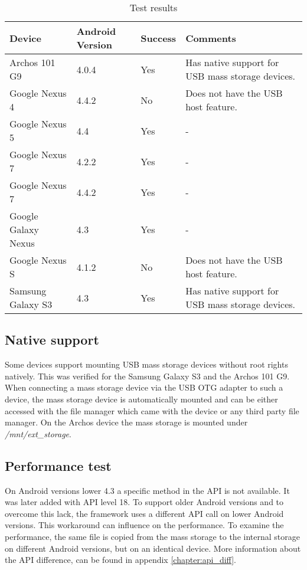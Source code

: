 \begin{table}[ht]
\caption{Test results}
\centering
\begin{tabular}{|l|l|l|p{5.5cm}|}
\hline\hline
\textbf{Device} & \textbf{Android Version} & \textbf{Success} & \textbf{Comments} \\ \hline
Archos 101 G9 & 4.0.4 & Yes & Has native support for USB mass storage devices. \\ \hline
Google Nexus 4 & 4.4.2 & No & Does not have the USB host feature\cite{nexus_4_usb_host}. \\ \hline
Google Nexus 5 & 4.4 & Yes & - \\ \hline
Google Nexus 7 & 4.2.2 & Yes & - \\ \hline
Google Nexus 7 & 4.4.2 & Yes & - \\ \hline
Google Galaxy Nexus & 4.3 & Yes & - \\ \hline
Google Nexus S & 4.1.2 & No & Does not have the USB host feature. \\ \hline
Samsung Galaxy S3 & 4.3 & Yes & Has native support for USB mass storage devices. \\ \hline
\end{tabular}
\label{table:test_results}
\end{table}

\subsection{Native support}

Some devices support mounting USB mass storage devices without root rights natively. This was verified for the Samsung Galaxy S3 and the Archos 101 G9. When connecting a mass storage device via the USB OTG adapter to such a device, the mass storage device is automatically mounted and can be either accessed with the file manager which came with the device or any third party file manager. On the Archos device the mass storage is mounted under \textit{/mnt/ext\_storage}.

\subsection{Performance test}

On Android versions lower 4.3 a specific method in the API is not available. It was later added with API level 18. To support older Android versions and to overcome this lack, the framework uses a different API call on lower Android versions. This workaround can influence on the performance. To examine the performance, the same file is copied from the mass storage to the internal storage on different Android versions, but on an identical device. More information about the API difference, can be found in appendix \ref{chapter:api_diff}.

